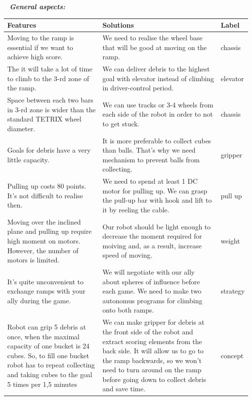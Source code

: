 	 \newline
	\textit{\textbf{General aspects:}}
	\begin{table}[H]
		\vspace{-2mm}
		\begin{center}
			\begin{tabular}{|p{0.4\linewidth}|p{0.5\linewidth}|p{0.1\linewidth}|}
				\hline
				Features & Solutions & Label \\
				\hline
				Moving to the ramp is essential if we want to achieve high score. & We need to realise the wheel base that will be good at moving on the ramp. & chassis \\
				\hline
				The it will take a lot of time to climb to the 3-rd zone of the ramp. & We can deliver debris to the highest goal with elevator instead of climbing in driver-control period. & elevator \\
				\hline
				Space between each two bars in 3-rd zone is wider than the standard TETRIX wheel diameter. & We can use tracks or 3-4 wheels from each side of the robot in order to not to get stuck. & chassis \\
				\hline
				Goals for debris have a very little capacity. & It is more preferable to collect cubes than balls. That's why we need mechanism to prevent balls from collecting. & gripper \\
				\hline
				Pulling up costs 80 points. It's not difficult to realise then. & We need to spend at least 1 DC motor for pulling up. We can grasp the pull-up bar with hook and lift to it by reeling the cable. & pull up \\
				\hline
				Moving over the inclined plane and pulling up require high moment on motors. However, the number of motors is limited. & Our robot should be light enough to decrease the moment required for moiving and, as a result, increase speed of moving. & weight \\
				\hline
				It's quite unconvenient to exchange ramps with your ally during the game. & We will negotiate with our ally about spheres of influence before each game. We need to make two autonomus programs for climbing onto both ramps. & strategy \\
				\hline
				Robot can grip 5 debris at once, when the maximal capacity of one bucket is 24 cubes. So, to fill one bucket robot has to repeat collecting and taking cubes to the goal 5 times per 1,5 minutes & We can make gripper for debris at the front side of the robot and extract scoring elements from the back side. It will allow us to go to the ramp backwards, so we won't need to turn around on the ramp before going down to collect debris and save time. & concept \\

\end{tabular}
\end{center}
\end{table}
